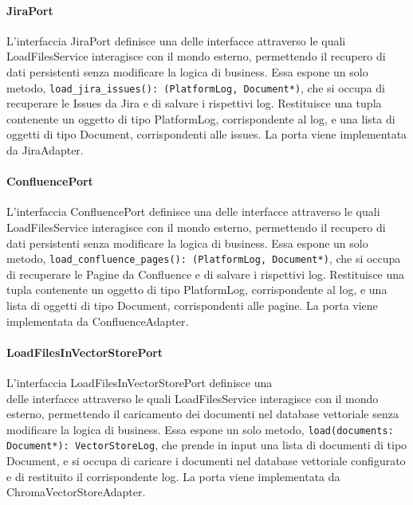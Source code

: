 \paragraph{JiraPort}
\label{sec:jira_port}
L'interfaccia JiraPort definisce una delle interfacce attraverso le quali LoadFilesService interagisce con il mondo esterno, permettendo il recupero di dati persistenti senza modificare la logica di business. Essa espone un solo metodo, \texttt{load\_jira\_issues(): (PlatformLog, Document*)}, che si occupa di recuperare le Issues da Jira e di salvare i rispettivi log. Restituisce una tupla contenente un oggetto di tipo PlatformLog, corrispondente al log, e una lista di oggetti di tipo Document, corrispondenti alle issues. La porta viene implementata da JiraAdapter.

\paragraph{ConfluencePort}
\label{sec:confluence_port}
L'interfaccia ConfluencePort definisce una delle interfacce attraverso le quali LoadFilesService interagisce con il mondo esterno, permettendo il recupero di dati persistenti senza modificare la logica di business. Essa espone un solo metodo, \texttt{load\_confluence\_pages(): (PlatformLog, Document*)}, che si occupa di recuperare le Pagine da Confluence e di salvare i rispettivi log. Restituisce una tupla contenente un oggetto di tipo PlatformLog, corrispondente al log, e una lista di oggetti di tipo Document, corrispondenti alle pagine. La porta viene implementata da ConfluenceAdapter.

\paragraph{LoadFilesInVectorStorePort}
\label{sec:load_files_in_vector_store_port}
L'interfaccia LoadFilesInVectorStorePort definisce una\\ delle interfacce attraverso le quali LoadFilesService interagisce con il mondo esterno, permettendo il caricamento dei documenti nel database vettoriale senza modificare la logica di business. Essa espone un solo metodo, \texttt{load(documents: Document*): VectorStoreLog}, che prende in input una lista di documenti di tipo Document, e si occupa di caricare i documenti nel database vettoriale configurato e di restituito il corrispondente log. La porta viene implementata da ChromaVectorStoreAdapter.

